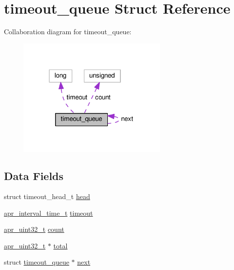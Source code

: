 \hypertarget{structtimeout__queue}{}\section{timeout\+\_\+queue Struct Reference}
\label{structtimeout__queue}


Collaboration diagram for timeout\+\_\+queue\+:
\nopagebreak
\begin{figure}[H]
\begin{center}
\leavevmode
\includegraphics[width=210pt]{structtimeout__queue__coll__graph}
\end{center}
\end{figure}
\subsection*{Data Fields}
\begin{DoxyCompactItemize}
\item 
struct timeout\+\_\+head\+\_\+t \hyperlink{structtimeout__queue_a0f585b81356cfec5ce3006c0d8d983b9}{head}
\item 
\hyperlink{group__apr__time_gaae2129185a395cc393f76fabf4f43e47}{apr\+\_\+interval\+\_\+time\+\_\+t} \hyperlink{structtimeout__queue_a79a70b45268ddbe1c34691d3c1d6bce3}{timeout}
\item 
\hyperlink{group__apr__platform_ga558548a135d8a816c4787250744ea147}{apr\+\_\+uint32\+\_\+t} \hyperlink{structtimeout__queue_a8ca439df449f64a41bbffb81d0f2d52c}{count}
\item 
\hyperlink{group__apr__platform_ga558548a135d8a816c4787250744ea147}{apr\+\_\+uint32\+\_\+t} $\ast$ \hyperlink{structtimeout__queue_a3dbf4a48f15888f486450af264c03405}{total}
\item 
struct \hyperlink{structtimeout__queue}{timeout\+\_\+queue} $\ast$ \hyperlink{structtimeout__queue_a05b525e4ecf43f704af89458a7913873}{next}
\end{DoxyCompactItemize}


